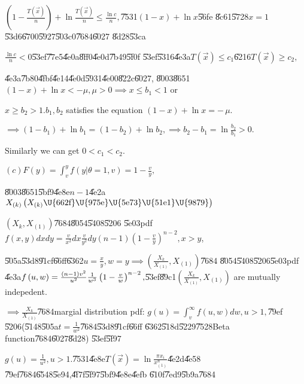 \documentclass{article}
\begin{document}
$\left( 1-\frac{T\left( \vec{x}\right) }{n}\right) +\ln \frac{T\left( \vec{x}%
\right) }{n}\leq \frac{\ln c}{n},$\U{7531}$\left( 1-x\right) +\ln x$\U{56fe}%
\U{8c61}\U{5728}$x=1$\U{53d6}\U{6700}\U{5927}\U{503c}0\U{7684}\U{6027}%
\U{8d28}\U{53ca}

$\frac{\ln c}{n}<0$\U{53ef}\U{77e5}\U{4e0a}\U{8ff0}\U{4e0d}\U{7b49}\U{5f0f}%
\U{53ef}\U{5316}\U{4e3a}$T\left( \vec{x}\right) \leq c_{1}$\U{6216}$T\left( 
\vec{x}\right) \geq c_{2},$

\U{4e3a}\U{7b80}\U{4fbf}\U{4e14}\U{4e0d}\U{5931}\U{4e00}\U{822c}\U{6027},%
\U{8003}\U{8651}$\left( 1-x\right) +\ln x<-\mu ,\mu >0\implies x\leq b_{1}<1$
or

$x\geq b_{2}>1.b_{1},b_{2}$ satisfies the equation $\left( 1-x\right) +\ln
x=-\,\mu .$

$\implies \left( 1-b_{1}\right) +\ln b_{1}=\left( 1-b_{2}\right) +\ln
b_{2},\implies b_{2}-b_{1}=\ln \frac{b_{2}}{b_{1}}>0.$

Similarly we can get $0<c_{1}<c_{2}.$

$\left( c\right) F\left( y\right) =\int_{v}^{y}f\left( y|\theta =1,v\right)
=1-\frac{v}{y},$

\U{8003}\U{8651}\U{5bf9}\U{4e8e}$n-1$\U{4e2a}$X_{\left( k\right) }\left(
X_{\left( k\right) }\text{\U{662f}\U{975e}\U{5e73}\U{51e1}\U{9879}}\right) $

$\left( X_{k},X_{\left( 1\right) }\right) $\U{7684}\U{8054}\U{5408}\U{5206}%
\U{5e03}pdf $f\left( x,y\right) dxdy=\frac{v}{x^{2}}dx\frac{v}{y^{2}}%
dy\left( n-1\right) \left( 1-\frac{v}{y}\right) ^{n-2},x>y$,

\U{505a}\U{53d8}\U{91cf}\U{66ff}\U{6362}$u=\frac{x}{y},w=y\implies \left( 
\frac{X_{k}}{X_{\left( 1\right) }},X_{\left( 1\right) }\right) $\U{7684}%
\U{8054}\U{5408}\U{5206}\U{5e03}pdf \U{4e3a}$f\left( u,w\right) =\frac{%
\left( n-1\right) v^{2}}{u^{2}}\frac{1}{w^{3}}\left( 1-\frac{v}{w}\right)
^{n-2},$\U{53ef}\U{89c1}$\left( \frac{X_{k}}{X_{\left( 1\right) }},X_{\left(
1\right) }\right) $ are mutually indepedent.

$\implies \frac{X_{k}}{X_{\left( 1\right) }}$\U{7684}margial distribution
pdf: $g\left( u\right) =\int_{v}^{\infty }f\left( u,w\right) dw,u>1,$\U{79ef}%
\U{5206}(\U{5148}\U{505a}$t=\frac{1}{w^{2}}$\U{7684}\U{53d8}\U{91cf}\U{66ff}%
\U{6362}\U{518d}\U{5229}\U{7528}Beta function\U{7684}\U{6027}\U{8d28})%
\U{53ef}\U{5f97}

$g\left( u\right) =\frac{1}{u^{2}},u>1.$\U{7531}\U{4e8e}$T\left( \vec{x}%
\right) =\ln \frac{\pi x_{i}}{x_{\left( 1\right) }^{n}}$\U{4e2d}\U{4e58}%
\U{79ef}\U{7684}\U{6548}\U{5e94},\U{4f7f}\U{5f97}\U{5bf9}\U{4e8e}\U{4efb}%
\U{610f}\U{7ed9}\U{5b9a}\U{7684}
\end{document}
